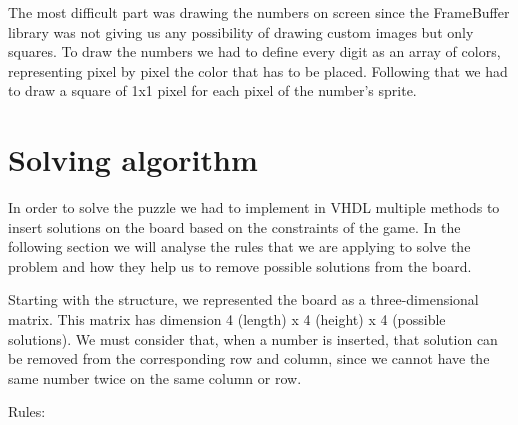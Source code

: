 \documentclass[12pt]{report}
\begin{document}
The most difficult part was drawing the numbers on screen since the
FrameBuffer library was not giving us any possibility of drawing custom
images but only squares. To draw the numbers we had to define every digit
as an array of colors, representing pixel by pixel the color that has to
be placed. Following that we had to draw a square of 1x1 pixel for each
pixel of the number's sprite.

\chapter*{Solving algorithm}

In order to solve the puzzle we had to implement in VHDL multiple methods
to insert solutions on the board based on the constraints of the game. In
the following section we will analyse the rules that we are applying to
solve the problem and how they help us to remove possible solutions from
the board.

Starting with the structure, we represented the board as
a three-dimensional matrix. This matrix has dimension 4 (length)
x 4 (height) x 4 (possible solutions). We must consider that, when
a number is inserted, that solution can be removed from the corresponding
row and column, since we cannot have the same number twice on the same
column or row.


Rules:
\end{document}
